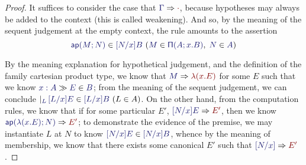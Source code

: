 \documentclass[main.tex]{subfiles}
\begin{document}
\begin{proof}
It suffices to consider the case that $\reduce{\Gamma}{\cdot}$,
because hypotheses may always be added to the context (this is called
weakening). And so, by the meaning of the sequent judgement at the
empty context, the rule amounts to the assertion
\[
  \hyp{
    \ver{\ap{M}{N}}{[N/x]B}
  }{
    \ver{M}{\typrod{A}{x}{B}},\; \ver{N}{A}
  }
\]

By the meaning explanation for hypothetical judgement, and the
definition of the family cartesian product type, we know that
$\reduce{M}{\lam{x}{E}}$ for some $E$ such that we know
$\sequent{x:A}{\ver{E}{B}}$; from the meaning of the sequent
judgement, we can conclude $\genj{L}{\hyp{\ver{[L/x]E}{[L/x]B}}{L\in
A}}$. On the other hand, from the computation rules, we know that if
for some particular $E'$, $\reduce{[N/x]E}{E'}$, then we know
$\reduce{\ap{\lam{x}{E}}{N}}{E'}$; to demonstrate the evidence of the
premise, we may instantiate $L$ at $N$ to know $\ver{[N/x]E}{[N/x]B}$,
whence by the meaning of membership, we know that there exists some
canonical $E'$ such that $\reduce{[N/x]}{E'}$.
\end{proof}
\end{document}
